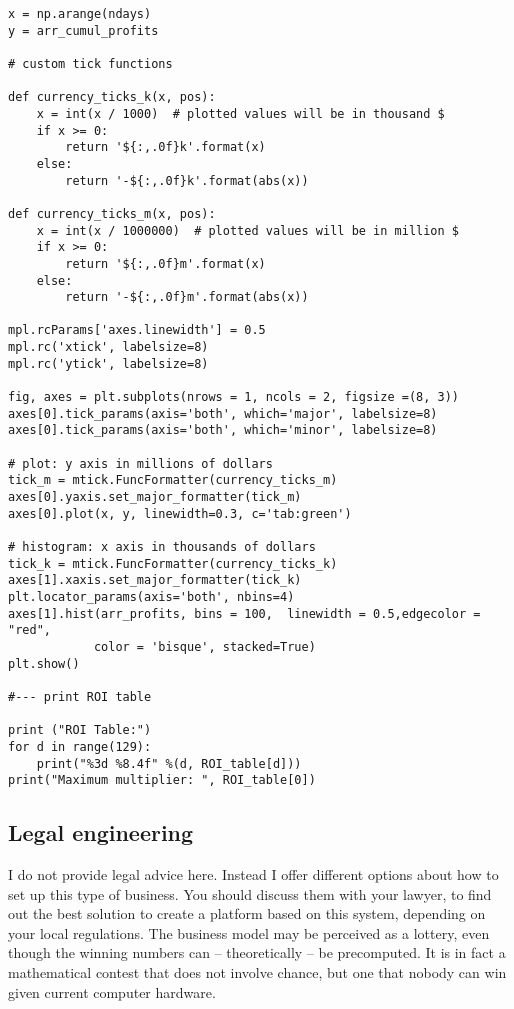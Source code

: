 \documentclass[oneside,10pt]{book}
\begin{document}
\begin{lstlisting}
x = np.arange(ndays)
y = arr_cumul_profits

# custom tick functions

def currency_ticks_k(x, pos):
    x = int(x / 1000)  # plotted values will be in thousand $
    if x >= 0:
        return '${:,.0f}k'.format(x)
    else:
        return '-${:,.0f}k'.format(abs(x))

def currency_ticks_m(x, pos):
    x = int(x / 1000000)  # plotted values will be in million $
    if x >= 0:
        return '${:,.0f}m'.format(x)
    else:
        return '-${:,.0f}m'.format(abs(x))

mpl.rcParams['axes.linewidth'] = 0.5
mpl.rc('xtick', labelsize=8) 
mpl.rc('ytick', labelsize=8) 

fig, axes = plt.subplots(nrows = 1, ncols = 2, figsize =(8, 3))
axes[0].tick_params(axis='both', which='major', labelsize=8)
axes[0].tick_params(axis='both', which='minor', labelsize=8)

# plot: y axis in millions of dollars
tick_m = mtick.FuncFormatter(currency_ticks_m)
axes[0].yaxis.set_major_formatter(tick_m)
axes[0].plot(x, y, linewidth=0.3, c='tab:green')

# histogram: x axis in thousands of dollars
tick_k = mtick.FuncFormatter(currency_ticks_k)
axes[1].xaxis.set_major_formatter(tick_k) 
plt.locator_params(axis='both', nbins=4)
axes[1].hist(arr_profits, bins = 100,  linewidth = 0.5,edgecolor = "red",
            color = 'bisque', stacked=True) 
plt.show()

#--- print ROI table

print ("ROI Table:")
for d in range(129):
    print("%3d %8.4f" %(d, ROI_table[d]))
print("Maximum multiplier: ", ROI_table[0])
\end{lstlisting}

\subsection{Legal engineering}

I do not provide legal advice here. Instead I offer different options about how to set up this type of business. You should discuss them with your lawyer, to find out the best solution to create a platform based on this system, depending on your local regulations. The business model may be perceived as a
 lottery, even though the winning numbers can -- theoretically -- be precomputed. It is in fact a mathematical contest that does not involve chance, but one that nobody can win given current computer hardware. 
\end{document}
